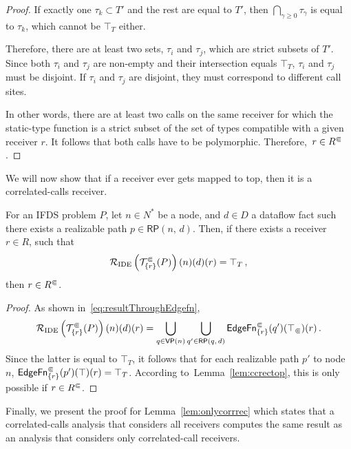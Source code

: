 \begin{proof}
 If exactly one $\tau_k\subset T'$ and the rest are equal to $T'$, then $\bigcap_{\gamma\ge 0}\tau_\gamma$ is equal to $\tau_k$, which cannot be $\top_T$ either.
 
 Therefore, there are at least two sets, $\tau_i$ and $\tau_j$, which are strict subsets of $T'$. Since both $\tau_i$ and $\tau_j$ are non-empty and their intersection equals $\top_T$, $\tau_i$ and $\tau_j$ must be disjoint. If $\tau_i$ and $\tau_j$ are disjoint, they must correspond to different call sites.
 
 In other words, there are at least two calls on the same receiver for which the static-type function is a strict subset of the set of types compatible with a given receiver $r$. It follows that both calls have to be polymorphic. Therefore,~${r\in{R^\Subset}}$.
\end{proof}

We will now show that if a receiver ever gets mapped to top, then it is a correlated-calls receiver.

\begin{lemma}\label{lem:ccrectop}
   For an IFDS problem $P$, let $n\in N^*$ be a node, and $d\in D$ a dataflow fact such there exists a realizable path $p\in\textsf{RP}(n,\,d)$.
   Then, if there exists a receiver $r\in R$, such that
  \[
    \mathcal R_{\text{IDE}}\left(\mathcal T^\Subset_{\{r\}}(P)\right)(n)(d)(r)=\top_T\,,
  \]
  then $r\in {R^\Subset}$.
\end{lemma}
\begin{proof}
  As shown in~\eqref{eq:resultThroughEdgefn},
  \[
    \mathcal R_{\text{IDE}}\left(\mathcal T^\Subset_{\{r\}}(P)\right)(n)(d)(r)=\bigcup_{q\in\textsf{VP}(n)}\bigcup_{q'\in\mathsf{RP}(q,\,d)}\textsf{EdgeFn}^\Subset_{\{r\}}(q')(\top_\Subset)(r)\,.
  \]
  Since the latter is equal to $\top_T$, it follows that for each realizable path $p'$ to node $n$, $\textsf{EdgeFn}^\Subset_{\{r\}}(p')(\top)(r)=\top_T$. According to~Lemma~\ref{lem:ccrectop}, this is only possible if $r\in{R^\Subset}$.
\end{proof}

Finally, we present the proof for Lemma~\ref{lem:onlycorrrec} which states that a correlated-calls analysis that considers all receivers computes the same result as an analysis that considers only correlated-call receivers.

